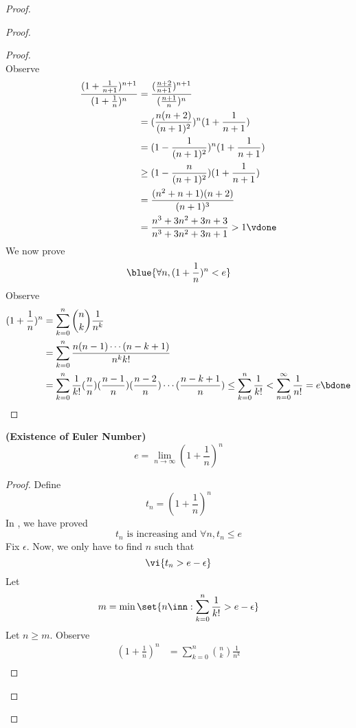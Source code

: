 \documentclass{report}
\begin{document}
\begin{proof}
\begin{proof}
\begin{proof}
\begin{equation*}
\end{equation*}
Observe
\begin{align*}
\frac{(1+\frac{1}{n+1})^{n+1}}{(1+\frac{1}{n})^n}&=\frac{(\frac{n+2}{n+1})^{n+1}}{(\frac{n+1}{n})^n}\\
&=(\frac{n(n+2)}{(n+1)^2})^n(1+\frac{1}{n+1})\\
&=(1-\frac{1}{(n+1)^2})^n (1+\frac{1}{n+1})\\
&\geq (1-\frac{n}{(n+1)^2})(1+\frac{1}{n+1})\\
&=\frac{(n^2+n+1)(n+2)}{(n+1)^3}\\
&=\frac{n^3+3n^2+3n+3}{n^3+3n^2+3n+1}> 1\vdone
\end{align*}
We now prove
\begin{equation*}
  \blue{\forall n,(1+\frac{1}{n})^n<e}
\end{equation*}
Observe
\begin{align*}
  (1+\frac{1}{n})^n&= \sum_{k=0}^n \binom{n}{k}\frac{1}{n^k}\\
  &=\sum_{k=0}^n \frac{n(n-1)\cdots (n-k+1)}{n^kk!}\\
  &=\sum_{k=0}^n \frac{1}{k!}(\frac{n}{n})(\frac{n-1}{n})(\frac{n-2}{n})\cdots (\frac{n-k+1}{n})\leq \sum_{k=0}^n \frac{1}{k!}<\sum_{n=0}^\infty \frac{1}{n!}=e\bdone
\end{align*}
\end{proof}
\begin{theorem}
\label{4.5.5}
\textbf{(Existence of Euler Number)} 
\begin{equation*}
e=\lim_{n\to\infty}(1+\frac{1}{n})^n
\end{equation*}
\end{theorem}
\begin{proof}
Define 
\begin{equation*}
t_n=(1+\frac{1}{n})^n
\end{equation*}
In , we have proved
\begin{equation*}
t_n\text{ is increasing and }\forall n, t_n\leq e
\end{equation*}
Fix $\epsilon $. Now, we only have to find $n$ such that 
 \begin{equation*}
   \vi{t_n>e-\epsilon}
\end{equation*}
Let
 \begin{equation*}
m=\min \set{n\inn: \sum_{k=0}^n \frac{1}{k!}>e-\epsilon }
\end{equation*}
Let $n\geq m$. Observe
\begin{align*}
  (1+\frac{1}{n})^n&= \sum_{k=0}^n \binom{n}{k}\frac{1}{n^k}\\

\end{align*}
\end{proof}
\end{proof}
\end{proof}
\end{document}
